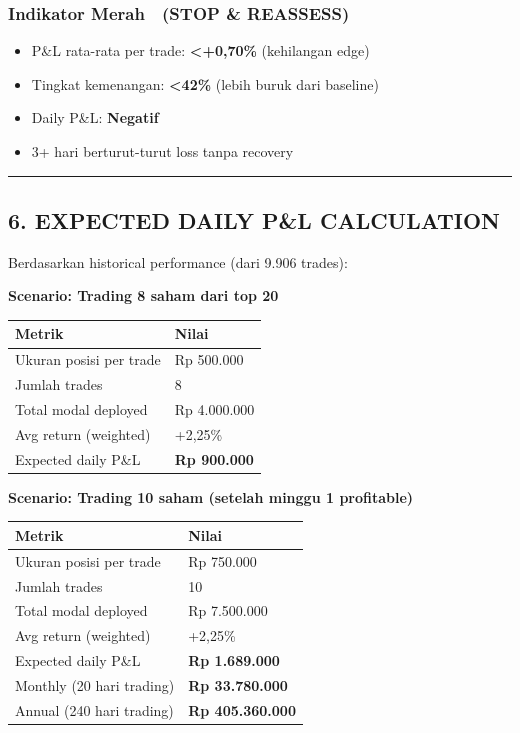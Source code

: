 \documentclass[
  10pt,
  a4paper,
]{article}
\providecommand{\tightlist}{%
  \setlength{\itemsep}{0pt}\setlength{\parskip}{0pt}}\usepackage{longtable,booktabs,array}
\begin{document}
\subsubsection{Indikator Merah 🔴 (STOP \&
REASSESS)}\label{indikator-merah-stop-reassess}

\begin{itemize}
\tightlist
\item
  P\&L rata-rata per trade: \textbf{\textless+0,70\%} (kehilangan edge)
\item
  Tingkat kemenangan: \textbf{\textless42\%} (lebih buruk dari baseline)
\item
  Daily P\&L: \textbf{Negatif}
\item
  3+ hari berturut-turut loss tanpa recovery
\end{itemize}

\begin{center}\rule{0.5\linewidth}{0.5pt}\end{center}

\subsection{6. EXPECTED DAILY P\&L
CALCULATION}\label{expected-daily-pl-calculation}

Berdasarkan historical performance (dari 9.906 trades):

\textbf{Scenario: Trading 8 saham dari top 20}

\begin{longtable}[]{@{}ll@{}}
\toprule\noalign{}
Metrik & Nilai \\
\midrule\noalign{}
\endhead
\bottomrule\noalign{}
\endlastfoot
Ukuran posisi per trade & Rp 500.000 \\
Jumlah trades & 8 \\
Total modal deployed & Rp 4.000.000 \\
Avg return (weighted) & +2,25\% \\
Expected daily P\&L & \textbf{Rp 900.000} \\
\end{longtable}

\vspace{0.2cm}

\textbf{Scenario: Trading 10 saham (setelah minggu 1 profitable)}

\begin{longtable}[]{@{}ll@{}}
\toprule\noalign{}
Metrik & Nilai \\
\midrule\noalign{}
\endhead
\bottomrule\noalign{}
\endlastfoot
Ukuran posisi per trade & Rp 750.000 \\
Jumlah trades & 10 \\
Total modal deployed & Rp 7.500.000 \\
Avg return (weighted) & +2,25\% \\
Expected daily P\&L & \textbf{Rp 1.689.000} \\
Monthly (20 hari trading) & \textbf{Rp 33.780.000} \\
Annual (240 hari trading) & \textbf{Rp 405.360.000} \\
\end{longtable}
\end{document}
